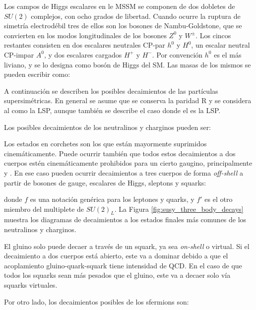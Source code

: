 Los campos de Higgs escalares en le MSSM se componen de dos dobletes de $SU(2)$ complejos, con ocho grados de libertad. Cuando ocurre la ruptura de simetría electrodébil tres de ellos son los bosones de Nambu-Goldstone, que se convierten en los modos longitudinales de los bosones $Z^0$ y $W^{\pm}$. Los cincos restantes consisten en dos escalares neutrales CP-par $h^0$ y $H^0$, un escalar neutral CP-impar $A^0$, y dos escalares cargados $H^+$ y $H^-$. Por convención $h^0$ es el más liviano, y se lo designa como bosón de Higgs del SM. Las masas de los mismos se pueden escribir como:





A continuación se describen los posibles decaimientos de las partículas supersimétricas. En general se asume que se conserva la paridad R y se considera al \ninoone como la LSP, aunque también se describe el caso donde el \gravino es la LSP.



Los posibles decaimientos de los neutralinos y charginos pueden ser:




Los estados en corchetes son los que están mayormente suprimidos cinemáticamente. Puede ocurrir también que todos estos decaimientos a dos cuerpos estén cinemáticamente prohibidos para un cierto gaugino, principalmente \chinoonepm y \ninotwo. En ese caso pueden ocurrir decaimientos a tres cuerpos de forma \textit{off-shell} a partir de bosones de gauge, escalares de Higgs, sleptons y squarks:



donde $f$ es una notación genérica para los leptones y quarks, y $f'$ es el otro miembro del multiplete de $SU(2)_L$. La Figura \ref{fig:susy_three_body_decays} muestra los diagramas de decaimientos a los estados finales más comunes de los neutralinos y charginos.




El gluino solo puede decaer a través de un squark, ya sea \textit{on-shell} o virtual. Si el decaimiento a
dos cuerpos está abierto, este va a dominar debido a que el acoplamiento gluino-quark-squark tiene intensidad de QCD.
En el caso de que todos los squarks sean más pesados que el gluino, este va a decaer solo vía
squarks virtuales.





Por otro lado, los decaimientos posibles de los sfermions son:






